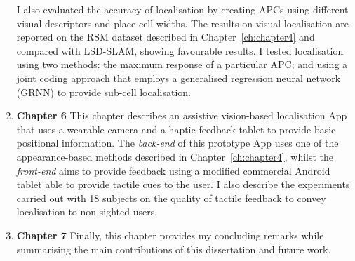 \begin{enumerate}
I also evaluated the accuracy of localisation by creating APCs using different visual descriptors and place cell widths. The results on visual localisation are reported on the RSM dataset described in Chapter~\ref{ch:chapter4} and compared with LSD-SLAM, showing favourable results. I tested localisation using two methods: the maximum response of a particular APC; and using a joint coding approach that employs a generalised regression neural network (GRNN) to provide sub-cell localisation.

\item \textbf{Chapter 6} This chapter describes an assistive vision-based localisation App that uses a wearable camera and a haptic feedback tablet to provide basic positional information. The \textit{back-end} of this prototype App uses one of the appearance-based methods described in Chapter~\ref{ch:chapter4}, whilst the \textit{front-end} aims to provide feedback using a modified commercial Android tablet able to provide tactile cues to the user. I also describe the experiments carried out with 18 subjects on the quality of tactile feedback to convey localisation to non-sighted users.

\item \textbf{Chapter 7} Finally, this chapter provides my concluding remarks while summarising the main contributions of this dissertation and future work.

\end{enumerate}